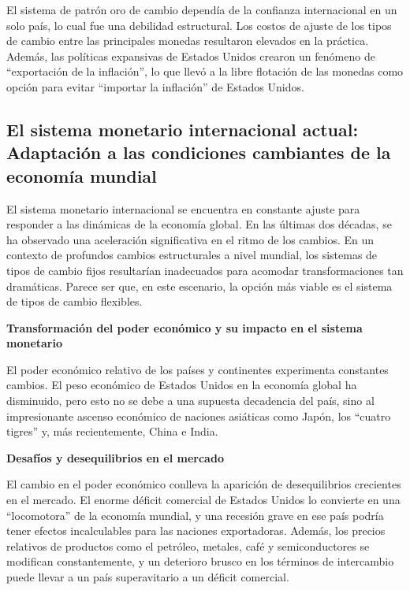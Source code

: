 \documentclass[
  jou,
  floatsintext,
  longtable,
  a4paper,
  nolmodern,
  notxfonts,
  notimes,
  12pt,
  colorlinks=true,linkcolor=blue,citecolor=blue,urlcolor=blue]{apa7}
\begin{document}
El sistema de patrón oro de cambio dependía de la confianza
internacional en un solo país, lo cual fue una debilidad estructural.
Los costos de ajuste de los tipos de cambio entre las principales
monedas resultaron elevados en la práctica. Además, las políticas
expansivas de Estados Unidos crearon un fenómeno de ``exportación de la
inflación'', lo que llevó a la libre flotación de las monedas como
opción para evitar ``importar la inflación'' de Estados Unidos.

\subsection{El sistema monetario internacional actual: Adaptación a las
condiciones cambiantes de la economía
mundial}\label{el-sistema-monetario-internacional-actual-adaptaciuxf3n-a-las-condiciones-cambiantes-de-la-economuxeda-mundial}

El sistema monetario internacional se encuentra en constante ajuste para
responder a las dinámicas de la economía global. En las últimas dos
décadas, se ha observado una aceleración significativa en el ritmo de
los cambios. En un contexto de profundos cambios estructurales a nivel
mundial, los sistemas de tipos de cambio fijos resultarían inadecuados
para acomodar transformaciones tan dramáticas. Parece ser que, en este
escenario, la opción más viable es el sistema de tipos de cambio
flexibles.

\textbf{Transformación del poder económico y su impacto en el sistema
monetario}

El poder económico relativo de los países y continentes experimenta
constantes cambios. El peso económico de Estados Unidos en la economía
global ha disminuido, pero esto no se debe a una supuesta decadencia del
país, sino al impresionante ascenso económico de naciones asiáticas como
Japón, los ``cuatro tigres'' y, más recientemente, China e India.

\textbf{Desafíos y desequilibrios en el mercado}

El cambio en el poder económico conlleva la aparición de desequilibrios
crecientes en el mercado. El enorme déficit comercial de Estados Unidos
lo convierte en una ``locomotora'' de la economía mundial, y una
recesión grave en ese país podría tener efectos incalculables para las
naciones exportadoras. Además, los precios relativos de productos como
el petróleo, metales, café y semiconductores se modifican
constantemente, y un deterioro brusco en los términos de intercambio
puede llevar a un país superavitario a un déficit comercial.
\end{document}

